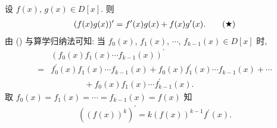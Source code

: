 \begin{proposition}
    设 $f(x)$, $g(x) \in D[x]$. 则
    \begin{align*}
        (f(x) g(x))^{\prime} = f^{\prime} (x) g(x) + f(x) g^{\prime} (x). \tag*{(\ding{72})}
    \end{align*}
    由 () 与算学归纳法可知: 当 $f_0 (x)$, $f_1 (x)$, $\cdots$, $f_{k-1} (x) \in D[x]$ 时,
    \begin{align*}
             & (f_0 (x) f_1 (x) \cdots f_{k-1} (x))^{\prime}                                                      \\
        = {} & f_0^{\prime} (x) f_1 (x) \cdots f_{k-1} (x) + f_0 (x) f_1^{\prime} (x) \cdots f_{k-1} (x) + \cdots \\
             & \qquad \qquad + f_0 (x) f_1 (x) \cdots f_{k-1}^{\prime} (x).
    \end{align*}
    取 $f_0 (x) = f_1 (x) = \cdots = f_{k-1} (x) = f(x)$ 知
    \begin{align*}
        ((f(x))^k)^{\prime} = k(f(x))^{k-1} f^{\prime} (x).
    \end{align*}
\end{proposition}

